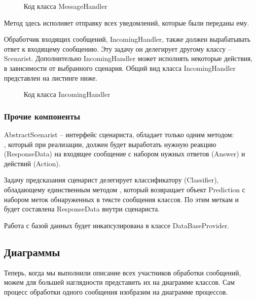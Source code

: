     \begin{figure}[!h]
        \centering
        
        \caption{Код класса MessageHandler}
        \label{fig:message_handler}
    \end{figure}

    Метод  здесь исполняет отправку всех уведомлений,
    которые были переданы ему.

    Обработчик входящих сообщений, IncomingHandler, также должен вырабатывать 
    ответ к входящему сообщению. Эту задачу он делегирует другому 
    классу -- Scenarist. Дополнительно IncomingHandler может исполнять некоторые
    действия, в зависимости от выбранного сценария.
    Общий вид класса IncomingHandler представлен на листинге ниже.

    \begin{figure}[!h]
        \centering
        
        \caption{Код класса IncomingHandler}
        \label{fig:incoming_handler}
    \end{figure}

    \subsubsection*{Прочие компоненты}
    AbstractScenarist -- интерфейс сценариста, обладает только одним методом:\\
    , который при реализации, должен
    будет выработать нужную реакцию (ResponseData) на входящее сообщение с
    набором нужных ответов (Answer) и действий (Action).

    Задачу предсказания сценарист делегирует классификатору (Classifier),
    обладающему единственным методом , который
    возвращает объект Prediction с набором меток обнаруженных в тексте сообщения
    классов. По этим меткам и будет составлена ResponseData внутри сценариста.

    Работа с базой данных будет инкапсулирована в классе DataBaseProvider.

    \subsection{Диаграммы}
    Теперь, когда мы выполнили описание всех участников обработки сообщений,
    можем для большей наглядности представить их на диаграмме классов.
    Сам процесс обработки одного сообщения изобразим на диаграмме процессов.

